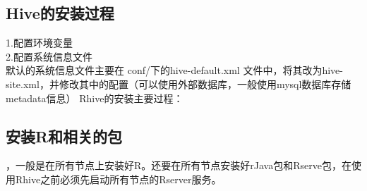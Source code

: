 \documentclass[12pt]{article}
\begin{document}
\begin{CJK*}{UTF8}{gbsn}
\subsection{Hive的安装过程}
1.配置环境变量 \\
2.配置系统信息文件\\
\indent  默认的系统信息文件主要在 conf/下的hive-default.xml 文件中，将其改为hive-site.xml，并修改其中的配置（可以使用外部数据库，一般使用mysql数据库存储metadata信息）
Rhive的安装主要过程： \\
\subsection{安装R和相关的包}
，一般是在所有节点上安装好R。还要在所有节点安装好rJava包和Rserve包，在使用Rhive之前必须先启动所有节点的Rserver服务。

\end{CJK*}
\end{document}
